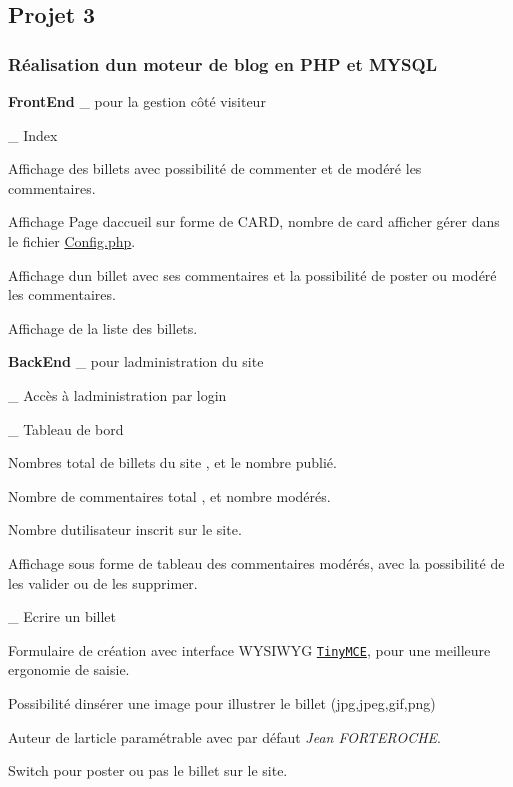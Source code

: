 \subsection*{Projet 3}

\subsubsection*{Réalisation d\textquotesingle{}un moteur de blog en P\+HP et M\+Y\+S\+QL}

{\bfseries Front\+End} \+\_\+ pour la gestion côté visiteur

\+\_\+ Index
\begin{DoxyItemize}
\item Affichage des billets avec possibilité de commenter et de modéré les commentaires.
\item Affichage Page d\textquotesingle{}accueil sur forme de C\+A\+RD, nombre de card afficher gérer dans le fichier \hyperlink{_config_8php}{Config.\+php}.
\item Affichage d\textquotesingle{}un billet avec ses commentaires et la possibilité de poster ou modéré les commentaires.
\item Affichage de la liste des billets.
\end{DoxyItemize}

{\bfseries Back\+End} \+\_\+ pour l\textquotesingle{}administration du site

\+\_\+ Accès à l\textquotesingle{}administration par login

\+\_\+ Tableau de bord
\begin{DoxyItemize}
\item Nombres total de billets du site , et le nombre publié.
\item Nombre de commentaires total , et nombre modérés.
\item Nombre d\textquotesingle{}utilisateur inscrit sur le site.
\item Affichage sous forme de tableau des commentaires modérés, avec la possibilité de les valider ou de les supprimer.
\end{DoxyItemize}

\+\_\+ Ecrire un billet
\begin{DoxyItemize}
\item Formulaire de création avec interface W\+Y\+S\+I\+W\+YG \href{https://www.tinymce.com/}{\tt Tiny\+M\+CE}, pour une meilleure ergonomie de saisie.
\item Possibilité d\textquotesingle{}insérer une image pour illustrer le billet (jpg,jpeg,gif,png)
\item Auteur de l\textquotesingle{}article paramétrable avec par défaut {\itshape Jean F\+O\+R\+T\+E\+R\+O\+C\+HE}.
\item Switch pour poster ou pas le billet sur le site.
\end{DoxyItemize}

